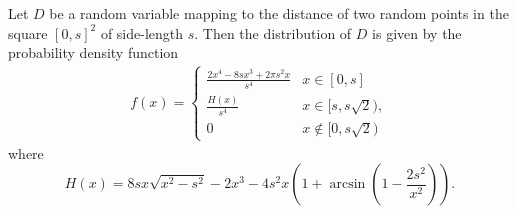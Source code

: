 \begin{theorem} \label{theorem:distance_square}
  Let $D$ be a random variable mapping to the distance of
  two random points in the square $[0,s]^2$ of side-length $s$. Then the
  distribution of $D$ is given by the probability density function
  \vspace{0.25cm}
  \begin{align}\label{eq:distance_square}
    f(x) = \begin{cases} \frac{2 x^4 - 8 s x^3 + 2 \pi s^2 x}{s^4} & x \in
      [0,s]\\ \frac{H(x)}{s^4} & x \in [s,s\sqrt{2}),\\0 & x \notin [0,s\sqrt{2})
               \end{cases}
  \end{align}
  where
  \[
    H(x)=8 s x \sqrt{x^2-s^2} - 2x^3  
          - 4 s^2 x \left(1+\arcsin\left(1-\frac{2 s^2}{x^2}\right)\right).
  \]
\end{theorem}
%
